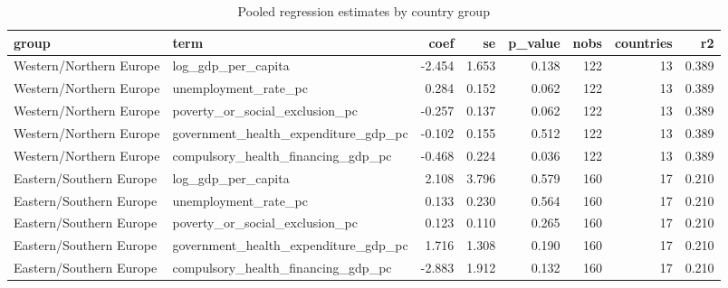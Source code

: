 \begin{table}
\caption{Pooled regression estimates by country group}
\label{tab:regression_country_groups}
\begin{tabular}{llrrrrrr}
\toprule
group & term & coef & se & p\_value & nobs & countries & r2 \\
\midrule
Western/Northern Europe & log\_gdp\_per\_capita & -2.454 & 1.653 & 0.138 & 122 & 13 & 0.389 \\
Western/Northern Europe & unemployment\_rate\_pc & 0.284 & 0.152 & 0.062 & 122 & 13 & 0.389 \\
Western/Northern Europe & poverty\_or\_social\_exclusion\_pc & -0.257 & 0.137 & 0.062 & 122 & 13 & 0.389 \\
Western/Northern Europe & government\_health\_expenditure\_gdp\_pc & -0.102 & 0.155 & 0.512 & 122 & 13 & 0.389 \\
Western/Northern Europe & compulsory\_health\_financing\_gdp\_pc & -0.468 & 0.224 & 0.036 & 122 & 13 & 0.389 \\
Eastern/Southern Europe & log\_gdp\_per\_capita & 2.108 & 3.796 & 0.579 & 160 & 17 & 0.210 \\
Eastern/Southern Europe & unemployment\_rate\_pc & 0.133 & 0.230 & 0.564 & 160 & 17 & 0.210 \\
Eastern/Southern Europe & poverty\_or\_social\_exclusion\_pc & 0.123 & 0.110 & 0.265 & 160 & 17 & 0.210 \\
Eastern/Southern Europe & government\_health\_expenditure\_gdp\_pc & 1.716 & 1.308 & 0.190 & 160 & 17 & 0.210 \\
Eastern/Southern Europe & compulsory\_health\_financing\_gdp\_pc & -2.883 & 1.912 & 0.132 & 160 & 17 & 0.210 \\
\bottomrule
\end{tabular}
\end{table}
